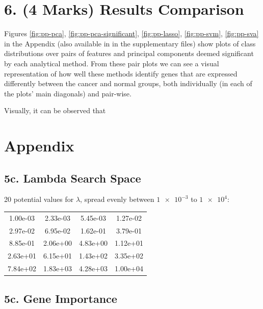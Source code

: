 \documentclass[twocolumn]{article}
\begin{document}
\section{6. (4 Marks) Results Comparison}

Figures \ref{fig:pp-pca}, \ref{fig:pp-pca-significant}, \ref{fig:pp-lasso}, \ref{fig:pp-svm}, \ref{fig:pp-sva} in the Appendix (also available in  in the supplementary files) show plots of class distributions over pairs of features and principal components deemed significant by each analytical method. From these pair plots we can see a visual representation of how well these methods identify genes that are expressed differently between the cancer and normal groups, both individually (in each of the plots' main diagonals) and pair-wise.

Visually, it can be observed that 



\newpage
\printbibliography[
    heading=bibintoc,
    title={References}
]

\newpage
\onecolumn
\section{Appendix}
\subsection{5c. Lambda Search Space}
20 potential values for $\lambda$, spread evenly between $\num{1e-3}$ to $\num{1e4}$:


\begin{table}[H]
    \centering
    \begin{tabular}{cccc}
        1.00e-03& 2.33e-03& 5.45e-03& 1.27e-02 \\
        2.97e-02& 6.95e-02& 1.62e-01& 3.79e-01 \\
        8.85e-01& 2.06e+00& 4.83e+00& 1.12e+01 \\
        2.63e+01& 6.15e+01& 1.43e+02& 3.35e+02 \\
        7.84e+02& 1.83e+03& 4.28e+03& 1.00e+04 \\
    \end{tabular}
\end{table}

\subsection{5c. Gene Importance}
\end{document}
